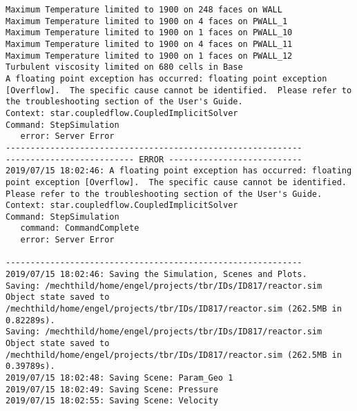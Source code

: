 \documentclass{article}
\begin{document}
{\begin{verbatim}
Maximum Temperature limited to 1900 on 248 faces on WALL
Maximum Temperature limited to 1900 on 4 faces on PWALL_1
Maximum Temperature limited to 1900 on 1 faces on PWALL_10
Maximum Temperature limited to 1900 on 4 faces on PWALL_11
Maximum Temperature limited to 1900 on 1 faces on PWALL_12
Turbulent viscosity limited on 680 cells in Base
A floating point exception has occurred: floating point exception [Overflow].  The specific cause cannot be identified.  Please refer to the troubleshooting section of the User's Guide.
Context: star.coupledflow.CoupledImplicitSolver
Command: StepSimulation
   error: Server Error
------------------------------------------------------------
-------------------------- ERROR ---------------------------
2019/07/15 18:02:46: A floating point exception has occurred: floating point exception [Overflow].  The specific cause cannot be identified.  Please refer to the troubleshooting section of the User's Guide.
Context: star.coupledflow.CoupledImplicitSolver
Command: StepSimulation
   command: CommandComplete
   error: Server Error

------------------------------------------------------------
2019/07/15 18:02:46: Saving the Simulation, Scenes and Plots.
Saving: /mechthild/home/engel/projects/tbr/IDs/ID817/reactor.sim
Object state saved to /mechthild/home/engel/projects/tbr/IDs/ID817/reactor.sim (262.5MB in 0.82289s).
Saving: /mechthild/home/engel/projects/tbr/IDs/ID817/reactor.sim
Object state saved to /mechthild/home/engel/projects/tbr/IDs/ID817/reactor.sim (262.5MB in 0.39789s).
2019/07/15 18:02:48: Saving Scene: Param_Geo 1
2019/07/15 18:02:49: Saving Scene: Pressure
2019/07/15 18:02:55: Saving Scene: Velocity
\end{verbatim}
}
\clearpage
\end{document}
